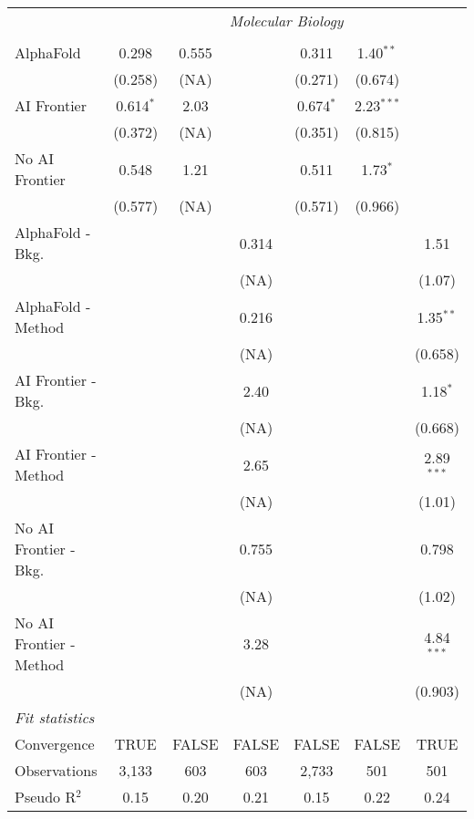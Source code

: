 \begin{tabular}{lcccccc}
 & \multicolumn{6}{c}{\textit{Molecular Biology}} \\ \\
   AlphaFold               & 0.298       & 0.555 &       & 0.311       & 1.40$^{**}$  &   \\   
                           & (0.258)     & (NA)  &       & (0.271)     & (0.674)      &   \\   
   AI Frontier             & 0.614$^{*}$ & 2.03  &       & 0.674$^{*}$ & 2.23$^{***}$ &   \\   
                           & (0.372)     & (NA)  &       & (0.351)     & (0.815)      &   \\   
   No AI Frontier          & 0.548       & 1.21  &       & 0.511       & 1.73$^{*}$   &   \\   
                           & (0.577)     & (NA)  &       & (0.571)     & (0.966)      &   \\   
   AlphaFold - Bkg.        &             &       & 0.314 &             &              & 1.51\\   
                           &             &       & (NA)  &             &              & (1.07)\\   
   AlphaFold - Method      &             &       & 0.216 &             &              & 1.35$^{**}$\\   
                           &             &       & (NA)  &             &              & (0.658)\\   
   AI Frontier - Bkg.      &             &       & 2.40  &             &              & 1.18$^{*}$\\   
                           &             &       & (NA)  &             &              & (0.668)\\   
   AI Frontier - Method    &             &       & 2.65  &             &              & 2.89$^{***}$\\   
                           &             &       & (NA)  &             &              & (1.01)\\   
   No AI Frontier - Bkg.   &             &       & 0.755 &             &              & 0.798\\   
                           &             &       & (NA)  &             &              & (1.02)\\   
   No AI Frontier - Method &             &       & 3.28  &             &              & 4.84$^{***}$\\   
                           &             &       & (NA)  &             &              & (0.903)\\   
   \midrule
   \emph{Fit statistics}\\
   Convergence             &TRUE         & FALSE & FALSE & FALSE       & FALSE        & TRUE\\  
   Observations            & 3,133       & 603   & 603   & 2,733       & 501          & 501\\  
   Pseudo R$^2$            & 0.15        & 0.20  & 0.21  & 0.15        & 0.22         & 0.24\\  
   

\end{tabular}
